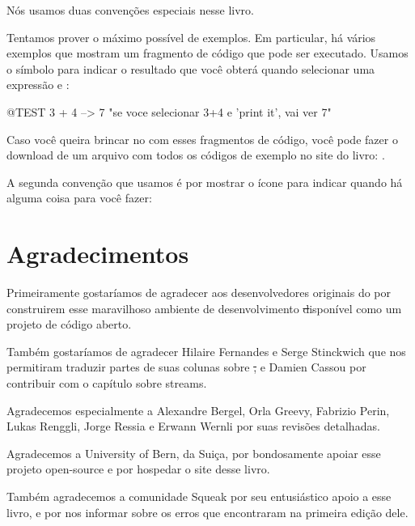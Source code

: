 \documentclass[a4paper,10pt,twoside]{book}
\begin{document}
Nós usamos duas convenções especiais nesse livro.

Tentamos prover o máximo possível de exemplos.
Em particular, há vários exemplos que mostram um fragmento de código que pode ser executado.  Usamos o símbolo \ct{-->} para indicar o resultado que você obterá quando selecionar uma expressão e :

\begin{code}{@TEST}
3 + 4 --> 7    "se voce selecionar 3+4 e 'print it', vai ver 7"
\end{code}

Caso você queira brincar no \pharo com esses fragmentos de código, você pode fazer o download de um arquivo com todos os códigos de exemplo no site do livro: \pbe.

A segunda convenção que usamos é por mostrar o ícone \dothisicon{} para indicar quando há alguma coisa para você fazer:


\section*{Agradecimentos}

Primeiramente gostaríamos de agradecer aos desenvolvedores originais do \squeak por construirem esse maravilhoso ambiente de desenvolvimento \st disponível como um projeto de código aberto.

Também gostaríamos de agradecer Hilaire Fernandes e Serge Stinckwich que nos permitiram traduzir partes de suas colunas sobre \st, e Damien Cassou por contribuir com o capítulo sobre streams.

Agradecemos especialmente a Alexandre Bergel, Orla Greevy, Fabrizio Perin, Lukas Renggli, Jorge Ressia e Erwann Wernli por suas revisões detalhadas.

Agradecemos a University of Bern, da Suiça, por bondosamente apoiar esse projeto open-source e por hospedar o site desse livro.

Também agradecemos a comunidade Squeak por seu entusiástico apoio a esse livro, e por nos informar sobre os erros que encontraram na primeira edição dele.

\ifx\wholebook\relax\else
   
   
\end{document}

